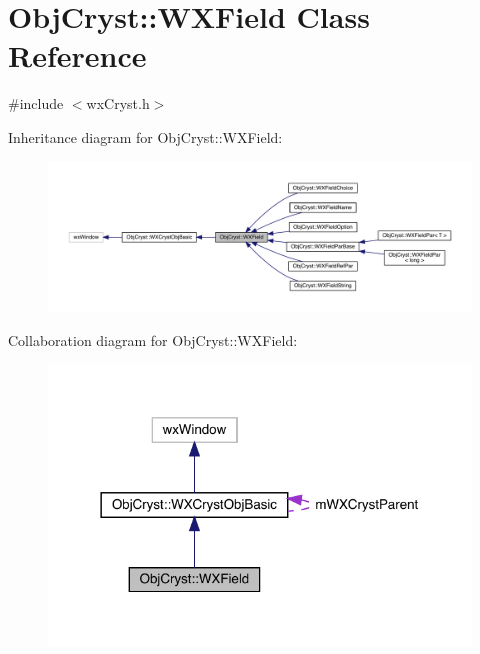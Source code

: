 \hypertarget{class_obj_cryst_1_1_w_x_field}{}\section{Obj\+Cryst\+::W\+X\+Field Class Reference}
\label{class_obj_cryst_1_1_w_x_field}


{\ttfamily \#include $<$wx\+Cryst.\+h$>$}



Inheritance diagram for Obj\+Cryst\+::W\+X\+Field\+:
\nopagebreak
\begin{figure}[H]
\begin{center}
\leavevmode
\includegraphics[width=350pt]{class_obj_cryst_1_1_w_x_field__inherit__graph}
\end{center}
\end{figure}


Collaboration diagram for Obj\+Cryst\+::W\+X\+Field\+:
\nopagebreak
\begin{figure}[H]
\begin{center}
\leavevmode
\includegraphics[width=318pt]{class_obj_cryst_1_1_w_x_field__coll__graph}
\end{center}
\end{figure}
